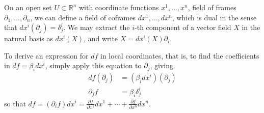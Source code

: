 \documentclass[psamsfonts]{amsart}
\theoremstyle{definition}
\theoremstyle{remark}
\newcommand*\R{\mathds{R}}
\numberwithin{equation}{section}
\begin{document}
On an open set $U\subset \R^n$ with coordinate functions $x^1, \dots, x^n$, field of frames $\partial_1, \dots, \partial_n$, we can define a field of coframes $dx^1, \dots, dx^n$, which is dual in the sense that $dx^i(\partial_j) = \delta^i_j$. We may extract the $i$-th component of a vector field $X$ in the natural basis as $dx^i(X)$, and write $X = dx^i(X)\partial_i$. 


To derive an expression for $df$ in local coordinates, that is, to find the coefficients in $df = \beta_i dx^i$, simply apply this equation to $\partial_j$, giving 
\begin{equation}\begin{aligned}
df(\partial_j) & = {} (\beta_i dx^i)(\partial_j)\\
\partial_j f &={} \beta_i \delta_j^i 
\end{aligned}\end{equation}
so that $df = (\partial_i f)dx^i = \frac{\partial f}{\partial x^1}dx^1+\cdots + \frac{\partial f}{\partial x^n}dx^n $. 
\end{document}

